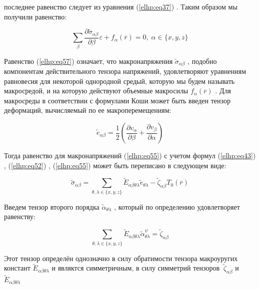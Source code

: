 последнее равенство следует из уравнения 
(\ref{elhp:eq37})
.
Таким образом мы получили равенство:

\begin{equation}
    \label{elhp:eq57}
        \sum_{\beta} \frac{ \partial \widetilde{\sigma}_{ \alpha\beta}} { \partial \beta}
            \varepsilon + f_{\alpha} \left( \overline{r}  \right) = 0
            , \; \alpha \in \{x,y,z\}
\end{equation}

Равенство 
(\ref{elhp:eq57})
означает, что макронапряжения 
$ \widetilde{\sigma}_{ \alpha\beta}$
, подобно компонентам действительного
тензора напряжений, удовлетворяют уравнениям равновесия для некоторой однородной
средый, которую мы будем называть макросредой, и на которую действуют объемные
макросилы 
$f_{\alpha} \left( \overline{r}  \right) $
. Для макросреды в соответствии с формулами Коши может быть введен
тензор деформаций, вычисляемый по ее макроперемещениям:

\begin{equation}
    \label{elhp:eq58}
    \widetilde{e}_{ \alpha\beta} =
    \frac{1}{2} 
    \left( 
        \frac{ \partial v_{\alpha}}{ \partial \beta} +
        \frac{ \partial v_{\beta}}{ \partial \alpha}
    \right) 
\end{equation}

Тогда равенство для макронапряжений 
(\ref{elhp:eq55})
с учетом формул 
(\ref{elhp:eq43})
, 
(\ref{elhp:eq52})
, 
(\ref{elhp:eq55})
может быть
переписано в следующем виде:

\begin{equation}
    \label{elhp:eq59}
    \widetilde{\sigma}_{ \alpha\beta} =
    \sum_{ \theta,\lambda \in \{x,y,z\} }
    \widetilde{E}_{ \alpha\beta \theta\lambda} 
    \widetilde{e}_{ \theta\lambda} -
    \widetilde{\zeta}_{ \alpha\beta} 
    T_0 \left( \overline{r}  \right) 
\end{equation}

Введем тензор второго порядка
$ \widetilde{\alpha}_{\theta\lambda}$
, который по определению удовлетворяет равенству:

\begin{equation}
    \label{elhp:eq60}
    \sum_{ \theta,\lambda \in \{x,y,z\} }
    \widetilde{E}_{ \alpha\beta \theta\lambda}
    \widetilde{\alpha}_{ \theta\lambda}^{\psi} =
    \widetilde{\zeta}_{ \alpha\beta}
\end{equation}

Этот тензор определён однозначно в силу обратимости тензора макроуругих констант 
$ \widetilde{E}_{ \alpha\beta \theta\lambda}$
и являктся симметричным, в силу симметрий тензоров 
$\ \widetilde{\zeta}_{ \alpha\beta}$
и
$ \widetilde{E}_{ \alpha\beta \theta\lambda}$

